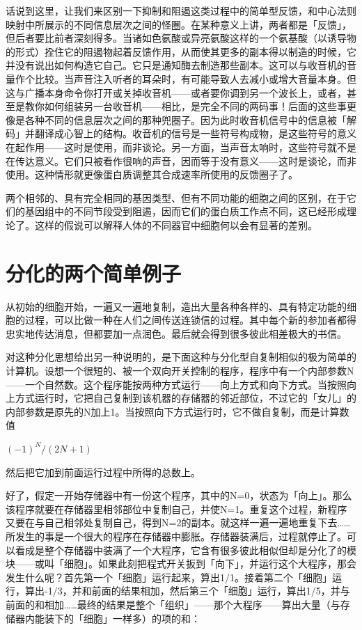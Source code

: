 \documentclass[
  12pt,
  twoside,
  openright,
  oldfontcommands,
]{memoir}
\begin{document}
话说到这里，让我们来区别一下抑制和阻遏这类过程中的简单型反馈，和中心法则映射中所展示的不同信息层次之间的怪圈。在某种意义上讲，两者都是「反馈」，但后者要比前者深刻得多。当诸如色氨酸或异亮氨酸这样的一个氨基酸（以诱导物的形式）拴住它的阻遏物起着反馈作用，从而使其更多的副本得以制造的时候，它并没有说出如何构造它自己。它只是通知酶去制造那些副本。这可以与收音机的音量作个比较。当声音注入听者的耳朵时，有可能导致人去减小或增大音量本身。但这与广播本身命令你打开或关掉收音机------或者要你调到另一个波长上，或者，甚至是教你如何组装另一台收音机------相比，是完全不同的两码事！后面的这些事更像是各种不同的信息层次之间的那种兜圈子。因为此时收音机信号中的信息被「解码」并翻译成心智上的结构。收音机的信号是一些符号构成物，是这些符号的意义在起作用------这时是使用，而非谈论。另一方面，当声音太响时，这些符号就不是在传达意义。它们只被看作很响的声音，因而等于没有意义------这时是谈论，而非使用。这种情形就更像蛋白质调整其合成速率所使用的反馈圈子了。

两个相邻的、具有完全相同的基因类型、但有不同功能的细胞之间的区别，在于它们的基因组中的不同节段受到阻遏，因而它们的蛋白质工作点不同，这已经形成理论了。这样的假说可以解释人体的不同器官中细胞何以会有显著的差别。

\section{分化的两个简单例子}

从初始的细胞开始，一遍又一遍地复制，造出大量各种各样的、具有特定功能的细胞的过程，可以比做一种在人们之间传送连锁信的过程。其中每个新的参加者都得忠实地传达消息，但都要加一点润色。最后就会得到很多彼此相差极大的书信。

对这种分化思想给出另一种说明的，是下面这种与分化型自复制相似的极为简单的计算机。设想一个很短的、被一个双向开关控制的程序，程序中有一个内部参数N------一个自然数。这个程序能按两种方式运行------向上方式和向下方式。当按照向上方式运行时，它把自己复制到该机器的存储器的邻近部位，不过它的「女儿」的内部参数是原先的N加上1。当按照向下方式运行时，它不做自复制，而是计算数值

$(-1)^N/(2N+1)$

然后把它加到前面运行过程中所得的总数上。

好了，假定一开始存储器中有一份这个程序，其中的N=0，状态为「向上」。那么该程序就要在存储器里相邻部位中复制自己，并使N=1。重复这个过程，新程序又要在与自己相邻处复制自己，得到N=2的副本。就这样一遍一遍地重复下去\ldots\ldots 所发生的事是一个很大的程序在存储器中膨胀。存储器装满后，过程就停止了。可以看成是整个存储器中装满了一个大程序，它含有很多彼此相似但却是分化了的模块------或叫「细胞」。如果此刻把程式开关扳到「向下」，并运行这个大程序，那会发生什么呢？首先第一个「细胞」运行起来，算出1/1。接着第二个「细胞」运行，算出-1/3，并和前面的结果相加，然后第三个「细胞」运行，算出1/5，并与前面的和相加\ldots\ldots 最终的结果是整个「组织」------那个大程序------算出大量（与存储器内能装下的「细胞」一样多）的项的和：
\end{document}
